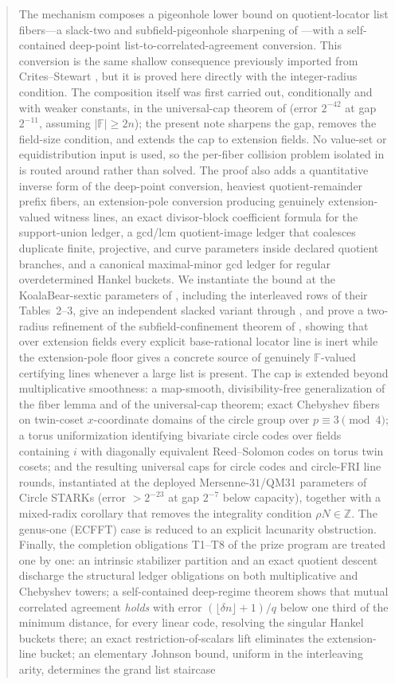 \documentclass[11pt]{article}
\theoremstyle{definition}
\theoremstyle{remark}
\newcommand{\F}{\mathbb{F}}
\begin{document}
\begin{abstract}
The mechanism composes a pigeonhole lower bound on quotient-locator list fibers---a slack-two and subfield-pigeonhole sharpening of \cite[Main Thm.\,(d)]{Cho26a}---with a self-contained deep-point list-to-correlated-agreement conversion. This conversion is the same shallow consequence previously imported from Crites--Stewart \cite[Thm.~2]{CS25}, but it is proved here directly with the integer-radius condition. The composition itself was first carried out, conditionally and with weaker constants, in the universal-cap theorem of \cite{Cho26b} (error $2^{-42}$ at gap $2^{-11}$, assuming $|\F|\ge2n$); the present note sharpens the gap, removes the field-size condition, and extends the cap to extension fields. No value-set or equidistribution input is used, so the per-fiber collision problem isolated in \cite{Cho26b} is routed around rather than solved. The proof also adds a quantitative inverse form of the deep-point conversion, heaviest quotient-remainder prefix fibers, an extension-pole conversion producing genuinely extension-valued witness lines, an exact divisor-block coefficient formula for the support-union ledger, a gcd/lcm quotient-image ledger that coalesces duplicate finite, projective, and curve parameters inside declared quotient branches, and a canonical maximal-minor gcd ledger for regular overdetermined Hankel buckets. We instantiate the bound at the KoalaBear-sextic parameters of \cite[\S6.3]{ABF26}, including the interleaved rows of their Tables~2--3, give an independent slacked variant through \cite[Thm.~1.9]{BCHKS25}, and prove a two-radius refinement of the subfield-confinement theorem of \cite{Cho26b}, showing that over extension fields every explicit base-rational locator line is inert while the extension-pole floor gives a concrete source of genuinely $\F$-valued certifying lines whenever a large list is present. The cap is extended beyond multiplicative smoothness: a map-smooth, divisibility-free generalization of the fiber lemma and of the universal-cap theorem; exact Chebyshev fibers on twin-coset $x$-coordinate domains of the circle group over $p\equiv3\pmod4$; a torus uniformization identifying bivariate circle codes over fields containing $i$ with diagonally equivalent Reed--Solomon codes on torus twin cosets; and the resulting universal caps for circle codes and circle-FRI line rounds, instantiated at the deployed Mersenne-$31$/QM31 parameters of Circle STARKs (error $>2^{-23}$ at gap $2^{-7}$ below capacity), together with a mixed-radix corollary that removes the integrality condition $\rho N\in\mathbb Z$. The genus-one (ECFFT) case is reduced to an explicit lacunarity obstruction. Finally, the completion obligations T1--T8 of the prize program are treated one by one: an intrinsic stabilizer partition and an exact quotient descent discharge the structural ledger obligations on both multiplicative and Chebyshev towers; a self-contained deep-regime theorem shows that mutual correlated agreement \emph{holds} with error $(\lfloor\delta n\rfloor+1)/q$ below one third of the minimum distance, for every linear code, resolving the singular Hankel buckets there; an exact restriction-of-scalars lift eliminates the extension-line bucket; an elementary Johnson bound, uniform in the interleaving arity, determines the grand list staircase 
\end{abstract}
\end{document}
